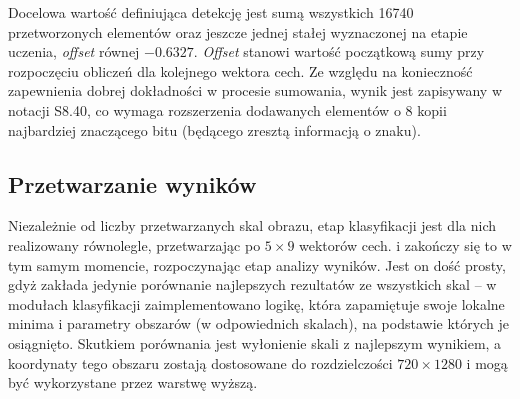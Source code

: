 Docelowa wartość definiująca detekcję jest sumą wszystkich 16740 przetworzonych elementów oraz jeszcze jednej stałej wyznaczonej na etapie uczenia, \textit{offset} równej $-0.6327$. 
\textit{Offset} stanowi wartość początkową sumy przy rozpoczęciu obliczeń dla kolejnego wektora cech. %
Ze względu na konieczność zapewnienia dobrej dokładności w procesie sumowania, wynik jest zapisywany w notacji S8.40, co wymaga rozszerzenia dodawanych elementów o 8 kopii najbardziej znaczącego bitu (będącego zresztą informacją o znaku).

\subsection{Przetwarzanie wyników}

Niezależnie od liczby przetwarzanych skal obrazu, etap klasyfikacji jest dla nich realizowany równolegle, przetwarzając po $5\times 9$ wektorów cech.  i zakończy się to w tym samym momencie, rozpoczynając etap analizy wyników. 
Jest on dość prosty, gdyż zakłada jedynie porównanie najlepszych rezultatów ze wszystkich skal -- w modułach klasyfikacji zaimplementowano logikę, która zapamiętuje swoje lokalne minima i parametry obszarów (w odpowiednich skalach), na podstawie których je osiągnięto. 
Skutkiem porównania jest wyłonienie skali z najlepszym wynikiem, a koordynaty tego obszaru zostają dostosowane do rozdzielczości $720 \times 1280$ i mogą być wykorzystane przez warstwę wyższą. %





